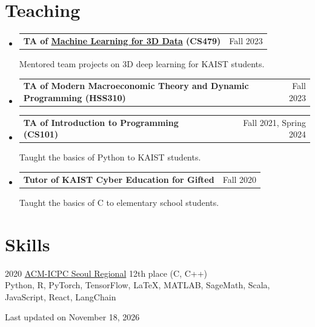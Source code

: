 \documentclass[10pt,a4paper]{article}
\makeatletter
\newenvironment{cvlist}{%
  \begin{itemize}[leftmargin=0pt,label={},itemsep=9pt,
    topsep=0pt,parsep=0pt,partopsep=0pt]%
}{\end{itemize}}
\newcommand{\entryhead}[2]{%
  \Needspace{4\baselineskip}%
  \item\begin{tabularx}{\linewidth}[t]{@{}>{\raggedright\arraybackslash}X@{\hspace{1em}}r@{}}%
    \textbf{#2} & {\small\color{muted}#1}\\
  \end{tabularx}\par\nobreak%
}
\newcommand{\link}[2]{\href{#1}{#2}}
\makeatother
\begin{document}
\section{Teaching}
\begin{cvlist}
  \entryhead{Fall 2023}{TA of \link{https://mhsung.github.io/kaist-cs479-fall-2023/}{Machine Learning for 3D Data} (CS479)}
  Mentored team projects on 3D deep learning for KAIST students.

  \entryhead{Fall 2023}{TA of Modern Macroeconomic Theory and Dynamic Programming (HSS310)}

  \entryhead{Fall 2021, Spring 2024}{TA of Introduction to Programming (CS101)}
  Taught the basics of Python to KAIST students.

  \entryhead{Fall 2020}{Tutor of KAIST Cyber Education for Gifted}
  Taught the basics of C to elementary school students.
\end{cvlist}

\section{Skills}
2020 \link{http://icpckorea.org/}{ACM-ICPC Seoul Regional} 12th place (C, C++)\\
Python, R, PyTorch, TensorFlow, \LaTeX, MATLAB, SageMath, Scala, JavaScript, React, LangChain

\begin{flushright}
  \footnotesize Last updated on November 18, 2026
\end{flushright}
\end{document}
